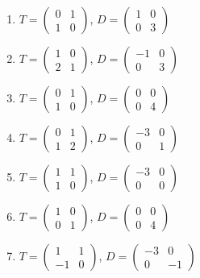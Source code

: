 \begin{enumerate}[label=\arabic*., leftmargin=*, itemsep=1pt]
\item $T=\left(\begin{smallmatrix}0 & 1\\ 1 & 0\end{smallmatrix}\right)$, $D=\left(\begin{smallmatrix}1 & 0\\ 0 & 3\end{smallmatrix}\right)$
\item $T=\left(\begin{smallmatrix}1 & 0\\ 2 & 1\end{smallmatrix}\right)$, $D=\left(\begin{smallmatrix}-1 & 0\\ 0 & 3\end{smallmatrix}\right)$
\item $T=\left(\begin{smallmatrix}0 & 1\\ 1 & 0\end{smallmatrix}\right)$, $D=\left(\begin{smallmatrix}0 & 0\\ 0 & 4\end{smallmatrix}\right)$
\item $T=\left(\begin{smallmatrix}0 & 1\\ 1 & 2\end{smallmatrix}\right)$, $D=\left(\begin{smallmatrix}-3 & 0\\ 0 & 1\end{smallmatrix}\right)$
\item $T=\left(\begin{smallmatrix}1 & 1\\ 1 & 0\end{smallmatrix}\right)$, $D=\left(\begin{smallmatrix}-3 & 0\\ 0 & 0\end{smallmatrix}\right)$
\item $T=\left(\begin{smallmatrix}1 & 0\\ 0 & 1\end{smallmatrix}\right)$, $D=\left(\begin{smallmatrix}0 & 0\\ 0 & 4\end{smallmatrix}\right)$
\item $T=\left(\begin{smallmatrix}1 & 1\\ -1 & 0\end{smallmatrix}\right)$, $D=\left(\begin{smallmatrix}-3 & 0\\ 0 & -1\end{smallmatrix}\right)$

\end{enumerate}
